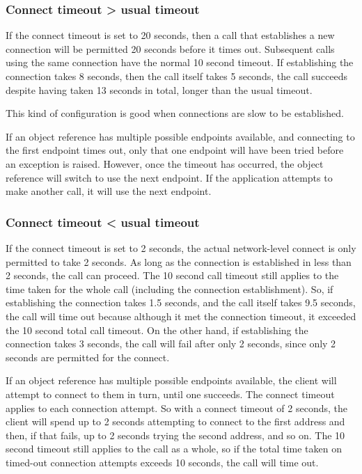 \documentclass[11pt,oneside,a4paper]{book}
\begin{document}
\subsubsection*{Connect timeout > usual timeout}

If the connect timeout is set to 20 seconds, then a call that
establishes a new connection will be permitted 20 seconds before it
times out. Subsequent calls using the same connection have the normal
10 second timeout. If establishing the connection takes 8 seconds,
then the call itself takes 5 seconds, the call succeeds despite having
taken 13 seconds in total, longer than the usual timeout.

This kind of configuration is good when connections are slow to be
established.

If an object reference has multiple possible endpoints available, and
connecting to the first endpoint times out, only that one endpoint
will have been tried before an exception is raised. However, once the
timeout has occurred, the object reference will switch to use the next
endpoint. If the application attempts to make another call, it will
use the next endpoint.


\subsubsection*{Connect timeout < usual timeout}

If the connect timeout is set to 2 seconds, the actual network-level
connect is only permitted to take 2 seconds. As long as the connection
is established in less than 2 seconds, the call can proceed. The 10
second call timeout still applies to the time taken for the whole call
(including the connection establishment). So, if establishing the
connection takes 1.5 seconds, and the call itself takes 9.5 seconds,
the call will time out because although it met the connection timeout,
it exceeded the 10 second total call timeout. On the other hand, if
establishing the connection takes 3 seconds, the call will fail after
only 2 seconds, since only 2 seconds are permitted for the connect.

If an object reference has multiple possible endpoints available, the
client will attempt to connect to them in turn, until one succeeds.
The connect timeout applies to each connection attempt. So with a
connect timeout of 2 seconds, the client will spend up to 2 seconds
attempting to connect to the first address and then, if that fails, up
to 2 seconds trying the second address, and so on. The 10 second
timeout still applies to the call as a whole, so if the total time
taken on timed-out connection attempts exceeds 10 seconds, the call
will time out.
\end{document}
